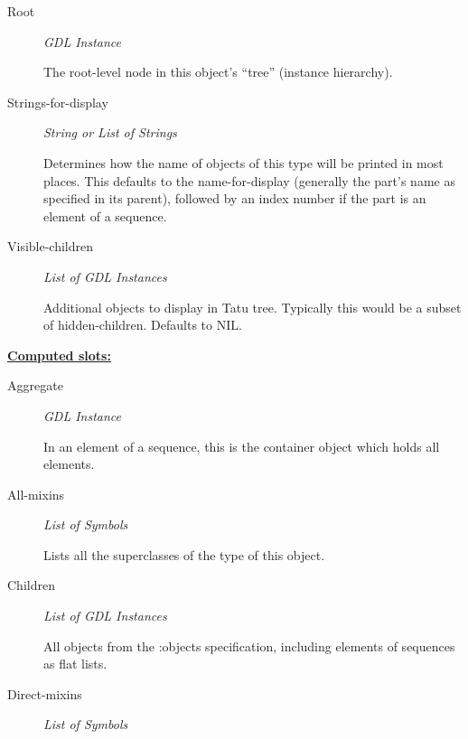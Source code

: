 \documentclass [11pt]{book}
\begin{document}
\begin{itemize}
\begin{description}
\item [Root]
\emph{GDL Instance}

 The root-level node in this object's ``tree'' (instance hierarchy).




\item [Strings-for-display]
\emph{String or List of Strings}

 Determines how the name of objects of
this type will be printed in most places.  This defaults to the
name-for-display (generally the part's name as specified in its
parent), followed by an index number if the part is an element of a
sequence.




\item [Visible-children]
\emph{List of GDL Instances}

 Additional objects to display in Tatu
tree. Typically this would be a subset of
hidden-children. Defaults to NIL.




\end{description}






\textbf{
\underline{Computed slots:}}

\begin{description}

\item [Aggregate]
\emph{GDL Instance}

 In an element of a sequence, this is the container object which holds all elements.




\item [All-mixins]
\emph{List of Symbols}

 Lists all the superclasses of the type of this object.




\item [Children]
\emph{List of GDL Instances}

 All objects from the :objects specification, including elements of sequences
as flat lists.




\item [Direct-mixins]
\emph{List of Symbols}


\end{description}
\end{itemize}
\end{document}
